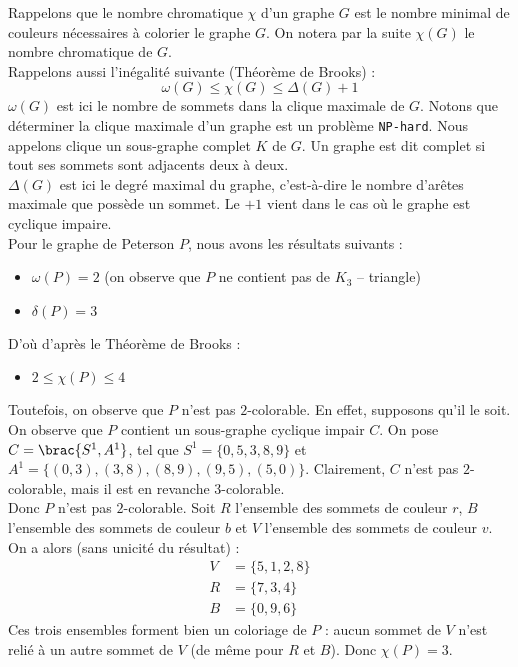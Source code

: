 Rappelons que le nombre chromatique $\chi$ d'un graphe $G$ est le nombre minimal de couleurs nécessaires à colorier le graphe $G$. On notera par la suite $\chi(G)$ le nombre chromatique de $G$.\\
Rappelons aussi l'inégalité suivante (Théorème de Brooks) : 
\begin{equation}
    \omega(G) \leq \chi(G) \leq \Delta(G) + 1
\end{equation}
$\omega(G)$ est ici le nombre de sommets dans la clique maximale de $G$. Notons que déterminer la clique maximale d'un graphe est un problème \texttt{NP-hard}. Nous appelons clique un sous-graphe complet $K$ de $G$. Un graphe est dit complet si tout ses sommets sont adjacents deux à deux.\\
$\Delta(G)$ est ici le degré maximal du graphe, c'est-à-dire le nombre d'arêtes maximale que possède un sommet. Le $+1$ vient dans le cas où le graphe est cyclique impaire.\\
Pour le graphe de Peterson $P$, nous avons les résultats suivants : 
\begin{itemize}
    \item $\omega(P) = 2$ (on observe que $P$ ne contient pas de $K_3$ -- triangle)
    \item $\delta(P) = 3$
\end{itemize}
D'où d'après le Théorème de Brooks : 
\begin{itemize}
    \item $2 \leq \chi(P) \leq 4$ 
\end{itemize}
Toutefois, on observe que $P$ n'est pas $2$-colorable. En effet, supposons qu'il le soit. On observe que $P$ contient un sous-graphe cyclique impair $C$. 
On pose $C = \brac{S^1,A^1}$, tel que $S^1 = \{ 0,5,3,8,9 \}$ et $A^1 = \{ (0,3), (3,8), (8,9), (9,5), (5,0) \}$. Clairement, $C$ n'est pas $2$-colorable, mais il est en revanche 3-colorable.\\
Donc $P$ n'est pas $2$-colorable. Soit $R$ l'ensemble des sommets de couleur $r$, $B$ l'ensemble des sommets de couleur $b$ et $V$ l'ensemble des sommets de couleur $v$. On a alors (sans unicité du résultat) :
\begin{align*}
    V &= \{ 5,1,2,8 \}\\
    R &= \{ 7,3,4 \}\\
    B &= \{ 0,9,6 \}
\end{align*}
Ces trois ensembles forment bien un coloriage de $P$ : aucun sommet de $V$ n'est relié à un autre sommet de $V$ (de même pour $R$ et $B$). 
Donc $\chi(P) = 3$.


